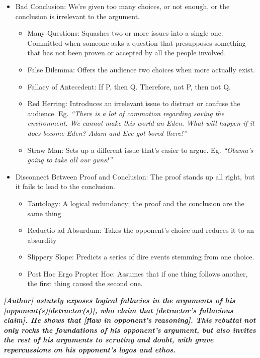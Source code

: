 \begin{itemize}
	\item Bad Conclusion: We're given too many choices, or not enough, or the conclusion is irrelevant to the argument.
		\begin{itemize}
			\item Many Questions: Squashes two or more issues into a single one. Committed when someone asks a question that presupposes something that has not been proven or accepted by all the people involved.
			\item False Dilemma: Offers the audience two choices when more actually exist.
			\item Fallacy of Antecedent: If P, then Q. Therefore, not P, then not Q.
			\item Red Herring: Introduces an irrelevant issue to distract or confuse the audience. Eg. \emph{``There is a lot of commotion regarding saving the environment. We cannot make this world an Eden. What will happen if it does become Eden? Adam and Eve got bored there!''}
			\item Straw Man: Sets up a different issue that's easier to argue. Eg. \emph{``Obama's going to take all our guns!''}
		\end{itemize}
	\item Disconnect Between Proof and Conclusion: The proof stands up all right, but it fails to lead to the conclusion.
		\begin{itemize}
			\item Tautology: A logical redundancy; the proof and the conclusion are the same thing
			\item Reductio ad Absurdum: Takes the opponent's choice and reduces it to an absurdity
			\item Slippery Slope: Predicts a series of dire events stemming from one choice.
			\item Post Hoc Ergo Propter Hoc: Assumes that if one thing follows another, the first thing caused the second one.
		\end{itemize}
\end{itemize}

\emph{\textbf{[Author] astutely exposes logical fallacies in the arguments of his [opponent(s)|detractor(s)], who claim that [detractor's fallacious claim]. He shows that [flaw in opponent's reasoning]. This rebuttal not only rocks the foundations of his opponent's argument, but also invites the rest of his arguments to scrutiny and doubt, with grave repercussions on his opponent's logos and ethos.}}


